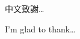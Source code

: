 \begin{acknowledgementszh}
中文致謝\ldots
\end{acknowledgementszh}

\begin{acknowledgementsen}
I'm glad to thank\ldots 
\end{acknowledgementsen}
